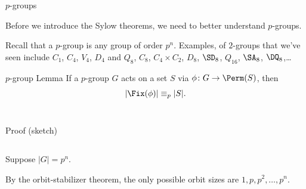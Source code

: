 \documentclass[8pt, handout]{beamer}
\newcommand{\Pause}{}      %
\begin{document}
\begin{frame}{$p$-groups} %

  Before we introduce the Sylow theorems, we need to better understand
  $p$-groups.

  \Pause\medskip
  
  Recall that a $p$-group is any group of order $p^n$. Examples, of
  $2$-groups that we've seen include $C_1$, $C_4$, $V_4$, $D_4$ and
  $Q_8$, $C_8$, $C_4\times C_2$, $D_8$, $\SD_8$, $Q_{16}$, $\SA_8$,
  $\DQ_8$,\dots

  \Pause\medskip
  
  \begin{block}{$p$-group Lemma}
    If a $p$-group $G$ acts on a set $S$ via $\phi\colon
    G\to\Perm(S)$, then
    \[
    |\Fix(\phi)|\equiv_p|S|.
    \]
    $\;$\vspace{-5mm}
  \end{block}

  \begin{exampleblock}{Proof (sketch)} \Pause
    \begin{columns}
      \begin{column}{.45\textwidth}
        Suppose $|G|=p^n$. 
        
        \bigskip\Pause 
        
        By the orbit-stabilizer theorem, the only possible orbit sizes
        are $1,p,p^2,\dots,p^n$.
      \end{column}
      

\end{columns}
\end{exampleblock}
\end{frame}
\end{document}
